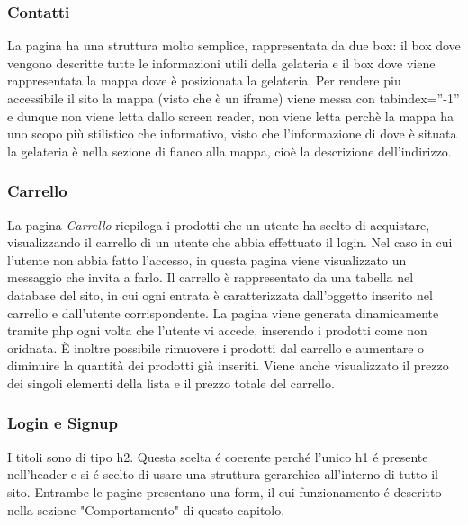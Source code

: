 		\subsubsection{Contatti}
			La pagina ha una struttura molto semplice, rappresentata da due box: il box dove vengono descritte tutte le informazioni utili della gelateria e il box dove viene rappresentata la mappa dove è posizionata la gelateria.
			Per rendere piu accessibile il sito la mappa (visto che è un iframe) viene messa con tabindex=”-1” e dunque non viene letta dallo screen reader, non viene letta perchè la mappa ha uno scopo più stilistico che informativo, visto che l'informazione di dove è situata la gelateria è nella sezione di fianco alla mappa, cioè la descrizione dell'indirizzo.
		\subsubsection{Carrello}
			La pagina \emph{Carrello} riepiloga i prodotti che un utente ha scelto di acquistare, visualizzando il carrello di un utente che abbia effettuato il login.
			Nel caso in cui l'utente non abbia fatto l'accesso, in questa pagina viene visualizzato un messaggio che invita a farlo.
			Il carrello è rappresentato da una tabella nel database del sito, in cui ogni entrata è caratterizzata dall'oggetto inserito nel carrello e dall'utente corrispondente. La pagina viene generata dinamicamente tramite php ogni volta che l'utente vi accede, inserendo i prodotti come non oridnata. È inoltre possibile rimuovere i prodotti dal carrello e aumentare o diminuire la quantità dei prodotti già inseriti.
			Viene anche visualizzato il prezzo dei singoli elementi della lista e il prezzo totale del carrello.
		\subsubsection{Login e Signup}
			I titoli sono di tipo h2.
			Questa scelta \'e coerente  perch\'e l'unico h1 \'e presente nell'header e si \'e scelto di usare una struttura gerarchica all'interno di tutto il sito.
			Entrambe le pagine presentano una form, il cui funzionamento \'e descritto nella sezione "Comportamento" di questo capitolo.
